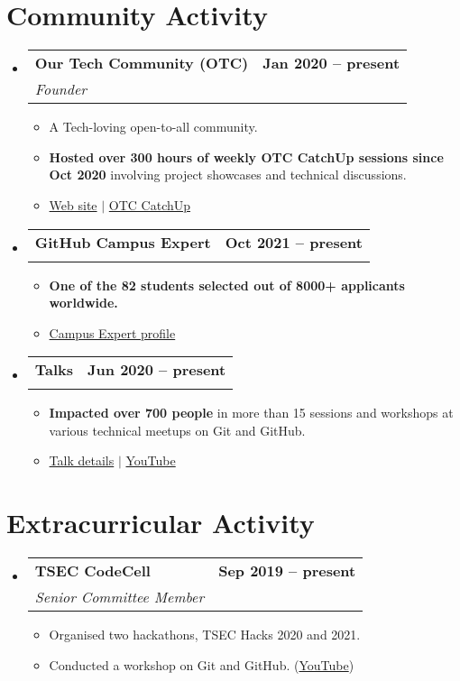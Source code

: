 \documentclass[letterpaper,11pt]{article}
\makeatletter
\newcommand{\resumeItem}[1]{
  \item\small{
    {#1 \vspace{-2pt}}
  }
}
\newcommand{\resumeSubheading}[4]{
  \vspace{-2pt}\item
    \begin{tabular*}{1.0\textwidth}[t]{l@{\extracolsep{\fill}}r}
      \vspace{-2pt}\textbf{#1} & \textbf{\small #2} \\
      \textit{\small#3} & \textit{\small #4} \\
    \end{tabular*}\vspace{-7pt}
}
\newcommand{\resumeSubHeadingListStart}{\begin{itemize}[leftmargin=0.0in, label={}]}
\newcommand{\resumeSubHeadingListEnd}{\end{itemize}}
\newcommand{\resumeItemListStart}{\begin{itemize}}
\newcommand{\resumeItemListEnd}{\end{itemize}\vspace{-5pt}}
\makeatother
\begin{document}
\section{Community Activity}
    \resumeSubHeadingListStart
        \resumeSubheading
            {Our Tech Community (OTC)}{Jan 2020 -- present}
            {Founder}{}
            \vspace{-7pt}
            \resumeItemListStart
                \resumeItem{A Tech-loving open-to-all community.}
                \resumeItem{\textbf{Hosted over 300 hours of weekly OTC CatchUp sessions since Oct 2020} involving project showcases and technical discussions.}
                \resumeItem{\href{https://ourtech.community}{Web site} $|$ \href{https://catchup.ourtech.community}{OTC CatchUp}}
            \resumeItemListEnd
        \vspace{-2pt}

        \resumeSubheading
            {GitHub Campus Expert}{Oct 2021 -- present}
            {}{}
            \vspace{-18pt}
            \resumeItemListStart
                \resumeItem{\textbf{One of the 82 students selected out of 8000+ applicants worldwide.}}
                \resumeItem{\href{https://githubcampus.expert/HarshKapadia2}{Campus Expert profile}}
            \resumeItemListEnd
        \vspace{-4pt}

        \resumeSubheading
            {Talks}{Jun 2020 -- present}
            {}{}
            \vspace{-18pt}
            \resumeItemListStart
                \resumeItem{\textbf{Impacted over 700 people} in more than 15 sessions and workshops at various technical meetups on Git and GitHub.}
                \resumeItem{\href{https://harshkapadia2.github.io/talks}{Talk details} $|$ \href{https://www.youtube.com/HarshKapadia}{YouTube}}
            \resumeItemListEnd
    \resumeSubHeadingListEnd
\vspace{-19pt}


\section{Extracurricular Activity}
    \resumeSubHeadingListStart
        \resumeSubheading
            {TSEC CodeCell}{Sep 2019 -- present}
            {Senior Committee Member}{}
            \resumeItemListStart
                \resumeItem{Organised two hackathons, TSEC Hacks 2020 and 2021.}
                \resumeItem{Conducted a workshop on Git and GitHub. (\href{https://www.youtube.com/watch?v=ArOKEf8nkfw}{YouTube})}
            \resumeItemListEnd
    \resumeSubHeadingListEnd
\vspace{-8pt}
\end{document}
